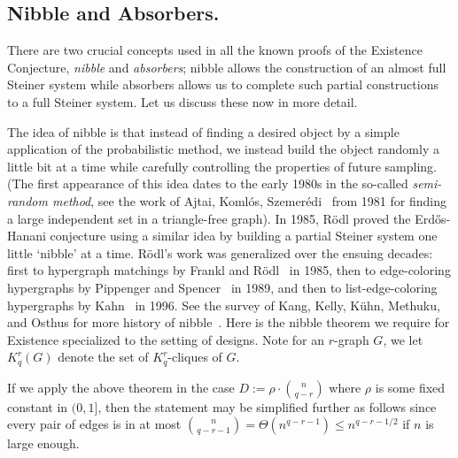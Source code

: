 \documentclass[twoside,leqno]{article}
\begin{document}
\subsection{Nibble and Absorbers.}
There are two crucial concepts used in all the known proofs of the Existence Conjecture, \emph{nibble} and \emph{absorbers}; nibble allows the construction of an almost full Steiner system while absorbers allows us to complete such partial constructions to a full Steiner system. Let us discuss these now in more detail.

The idea of nibble is that instead of finding a desired object by a simple application of the probabilistic method, we instead build the object randomly a little bit at a time while carefully controlling the properties of future sampling. (The first appearance of this idea dates to the early 1980s in the so-called \emph{semi-random method}, see the work of Ajtai, Koml\'os, Szemer\'edi~\cite{AKS81} from 1981 for finding a large independent set in a triangle-free graph). In 1985, R\"odl proved the Erd\H{o}s-Hanani conjecture using a similar idea by building a partial Steiner system one little `nibble' at a time. R\"odl's work was generalized over the ensuing decades: first to hypergraph matchings by Frankl and R\"odl~\cite{FR85} in 1985, then to edge-coloring hypergraphs by Pippenger and Spencer~\cite{PS89} in 1989, and then to list-edge-coloring hypergraphs by Kahn~\cite{K96} in 1996. See the survey of Kang, Kelly, K\"uhn, Methuku, and Osthus for more history of nibble~\cite{KKKMO21}. Here is the nibble theorem we require for Existence specialized to the setting of designs. Note for an $r$-graph $G$, we let $K_q^r(G)$ denote the set of $K_q^r$-cliques of $G$.


If we apply the above theorem in the case $D:= \rho\cdot \binom{n}{q-r}$ where $\rho$ is some fixed constant in $(0,1]$, then the statement may be simplified further as follows since every pair of edges is in at most $\binom{n}{q-r-1} = \Theta(n^{q-r-1}) \le n^{q-r-1/2}$ if $n$ is large enough. 
\end{document}
